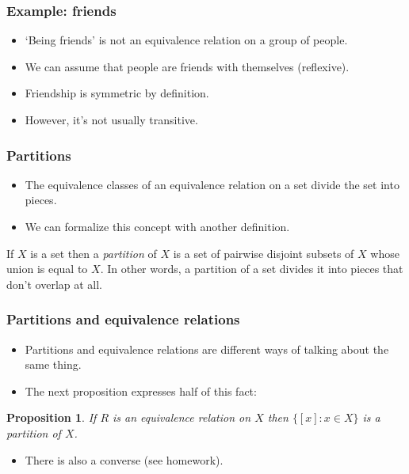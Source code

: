 \documentclass[handout]{beamer}
\newtheorem{proposition}[theorem]{Proposition}{\bfseries}{\itshape}
\begin{document}
\begin{frame}
\frametitle{Example: friends}
\begin{example}
\begin{itemize}
\item `Being friends' is not an equivalence relation on a group of people. 
\vspace{0.3cm}
\item We can assume that people are friends with themselves (reflexive).
\vspace{0.3cm}
\item Friendship is symmetric by definition. 
\vspace{0.3cm}
\item However, it's not usually transitive. 
\end{itemize}
\end{example}
\end{frame}

\begin{frame}
\frametitle{Partitions}
\begin{itemize}
\item The equivalence classes of an equivalence relation on a set divide the set into pieces. 
\vspace{0.3cm}
\item We can formalize this concept with another definition.
\end{itemize}
\vspace{0.3cm}
\begin{definition}[Partition] \label{D:part}
If $X$ is a set then a \emph{partition} of $X$ is a set of pairwise disjoint subsets of $X$ whose union is equal to $X$. \newline\newline In other words, a partition of a set divides it into pieces that don't overlap at all. 
\end{definition}
\end{frame}

\begin{frame}
\frametitle{Partitions and equivalence relations}
\begin{itemize}
\item Partitions and equivalence relations are different ways of talking about the same thing.
\item The next proposition expresses half of this fact:
\end{itemize}
\vspace{0.5cm}
\begin{proposition}\label{P:part}
If $R$ is an equivalence relation on $X$ then $\{[x]:x\in X\}$ is a partition of $X$.
\end{proposition}
\vspace{0.5cm}
\begin{itemize}
\item There is also a converse (see homework).
\end{itemize}
\end{frame}
\end{document}
